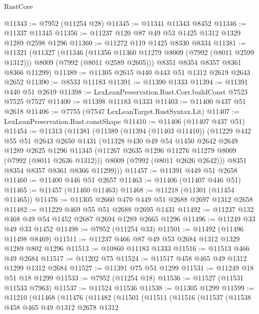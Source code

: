 \begin{lexlean}{RustCore}
\begin{coremodule}
@11343 := @7952 (@11254 @28)
@11345 := @11341 @11343 @8452
@11346 := @11337 @11345
@11356 := @11237 @120 @87 @49 @53 @1425 @1312 @1329 @1289 @2598 @1296
@11360 := @11272 @119 @1425 @8330 @8334
@11381 := @11321
    (@11327
      (@11346
        (@11356 @11360 @11279 @8009 (@7992 (@8011 @2599 @1312)))
        @8009
        (@7992 (@8011 @2589 @2605)))
      @8351
      @8354
      @8357
      @8361
      @8366
      @11299)
@11389 := @11305 @2615 @440 @443 @51 @1312 @2619 @2643 @2652
@11390 := @8533 @11183
@11391 := @11390 @1333
@11394 := @11391 @440 @51 @2619
@11398 := LexLeanPreservation.Rust.Corr.buildConst @7523 @7525 @7527
@11400 := @11398 @11183 @1333
@11403 := @11400 @437 @51 @2618
@11406 := @7755 (@7547 LexLeanTarget.RustSyntax.Lit)
@11407 := LexLeanPreservation.Rust.constShape
@11410 := @11406 (@11407 @437 @51)
@11454 := @11313
    (@11381
      (@11389
        (@11394 (@11403 @11410))
        (@11229
          @442
          @55
          @51
          @2643
          @2650
          @1431
          (@11328
            @430
            @49
            @54
            @1450
            @2642
            @2649
            @1289
            @2625
            @1296
            @11345
            (@11267 @2635 @1296 @11276 @11279 @8009 (@7992 (@8011 @2636 @1312)))
            @8009
            (@7992 (@8011 @2626 @2642)))
          @8351
          @8354
          @8357
          @8361
          @8366
          @11299)))
@11457 := @11391 @449 @51 @2658
@11460 := @11400 @446 @51 @2657
@11463 := @11406 (@11407 @446 @51)
@11465 := @11457 (@11460 @11463)
@11468 := @11218 (@11301 (@11454 @11465))
@11476 := @11305 @2660 @470 @449 @51 @2688 @2697 @1312 @2658
@11482 := @11229 @469 @55 @51 @2688 @2695 @1431
@11492 := @11237 @132 @468 @49 @54 @1452 @2687 @2694 @1289 @2665 @1296
@11496 := @11249 @33 @49 @33 @1452
@11498 := @7952 (@11254 @33)
@11501 := @11492 (@11496 @11498 @8469)
@11511 := @11237 @466 @87 @49 @53 @2684 @1312 @1329 @1289 @802 @1296
@11513 := @10860 @11183 @1333
@11516 := @11513 @466 @49 @2684
@11517 := @11202 @75
@11524 := @11517 @458 @465 @49 @1312 @1299 @1312 @2684
@11527 := @11391 @75 @51 @1299
@11531 := @11249 @18 @51 @18 @1299
@11533 := @7952 (@11254 @18)
@11536 := @11527 (@11531 @11533 @7963)
@11537 := @11524 @11536
@11538 := @11305 @1299
@11599 := @11210
    (@11468
      (@11476
        (@11482
          (@11501
            (@11511
              (@11516
                (@11537
                  (@11538
                    @458
                    @465
                    @49
                    @1312
                    @2678
                    @1312

\end{coremodule}
\end{lexlean}
